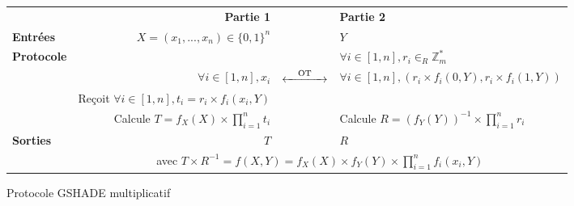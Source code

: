 \documentclass{article}
\begin{document}
\begin{figure}
\centering
\begin{tabular}{|lrcl|}
\hline
 & \textbf{Partie 1} & & \textbf{Partie 2}\\
\textbf{Entrées} & $X =(x_1, ..., x_n) \in \{0, 1\}^n$ & & $Y$\\
\textbf{Protocole} & & & $\forall i \in [1, n], r_i \in_R \mathbb{Z}_{m}^*$ \\
 & $\forall i \in [1, n], x_i$ & $\xleftrightarrow{\hspace{1em} \text{OT}\hspace{1em} }$ & $\forall i \in [1,n], (r_i \times f_i(0, Y), r_i \times f_i(1, Y))$ \\
 & Reçoit $\forall i \in [1,n], t_i = r_i \times f_i(x_i, Y)$ & & \\
 & Calcule $T = f_X(X) \times \prod_{i=1}^n t_i$ & & Calcule $R = (f_Y(Y))^{-1} \times \prod_{i=1}^n r_i$ \\
\textbf{Sorties} & $T$ & & $R$ \\
 & \multicolumn{3}{c|}{avec $T \times R^{-1} = f(X, Y) = f_X(X) \times f_Y(Y) \times \prod_{i=1}^n f_i(x_i, Y)$} \\
\hline
\end{tabular}
\captionsetup{labelformat=empty}
\caption{Protocole GSHADE multiplicatif}
\end{figure}
\end{document}
